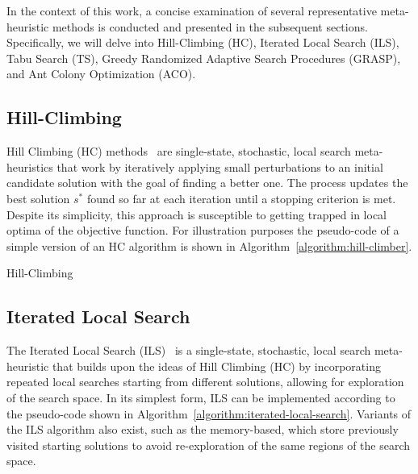 In the context of this work, a concise examination of several representative
meta-heuristic methods is conducted and presented in the subsequent sections.
Specifically, we will delve into Hill-Climbing (HC), Iterated Local Search
(ILS), Tabu Search (TS), Greedy Randomized Adaptive Search Procedures (GRASP),
and Ant Colony Optimization (ACO).

\subsection{Hill-Climbing}

Hill Climbing (HC) methods~\cite{luke2013essentialsa} are single-state,
stochastic, local search meta-heuristics that work by iteratively applying small
perturbations to an initial candidate solution with the goal of finding a better
one. The process updates the best solution $s^{*}$ found so far at each iteration
until a stopping criterion is met. Despite its simplicity, this approach is
susceptible to getting trapped in local optima of the objective function.  For
illustration purposes the pseudo-code of a simple version of an HC algorithm is
shown in Algorithm~\ref{algorithm:hill-climber}.

\begin{algorithm}[htb!]
    \DontPrintSemicolon
    \caption{Hill-Climbing}
    \label{algorithm:hill-climber}
\end{algorithm}

\subsection{Iterated Local Search}

The Iterated Local Search (ILS)~\cite{lourenco2010iterateda,luke2013essentialsa,
    blummetaheuristics} is a single-state, stochastic, local search meta-heuristic
that builds upon the ideas of Hill Climbing (HC) by incorporating repeated local
searches starting from different solutions, allowing for exploration of the
search space. In its simplest form, ILS can be implemented according to the
pseudo-code shown in Algorithm~\ref{algorithm:iterated-local-search}. Variants
of the ILS algorithm also exist, such as the memory-based, which store previously
visited starting solutions to avoid re-exploration of the same regions of the
search space.

